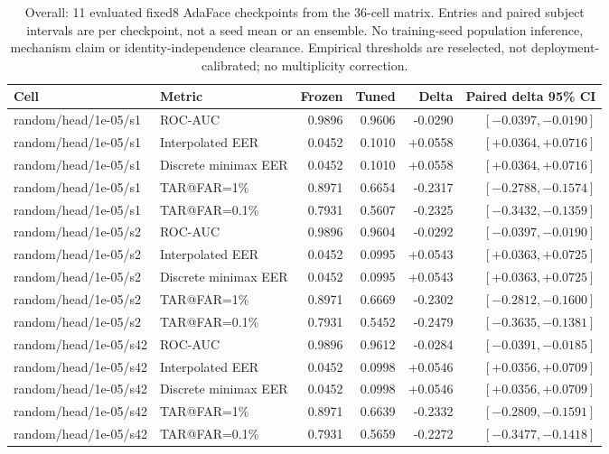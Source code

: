 \documentclass[journal]{IEEEtran}
\begin{document}
\clearpage
\begingroup
\renewcommand{\arraystretch}{0.98}
\begin{table}[!t]
\caption{Overall: 11 evaluated fixed8 AdaFace checkpoints from the 36-cell matrix. Entries and paired subject intervals are per checkpoint, not a seed mean or an ensemble. No training-seed population inference, mechanism claim or identity-independence clearance. Empirical thresholds are reselected, not deployment-calibrated; no multiplicity correction.}
\label{tab:strong-fixed8-overall}
\centering\scriptsize
\begin{tabular}{@{}llrrrr@{}}
\toprule
Cell & Metric & Frozen & Tuned & Delta & Paired delta 95\% CI \\
\midrule
random/head/1e-05/s1 & ROC-AUC & 0.9896 & 0.9606 & -0.0290 & $[-0.0397,-0.0190]$ \\
random/head/1e-05/s1 & Interpolated EER & 0.0452 & 0.1010 & +0.0558 & $[+0.0364,+0.0716]$ \\
random/head/1e-05/s1 & Discrete minimax EER & 0.0452 & 0.1010 & +0.0558 & $[+0.0364,+0.0716]$ \\
random/head/1e-05/s1 & TAR@FAR=1\% & 0.8971 & 0.6654 & -0.2317 & $[-0.2788,-0.1574]$ \\
random/head/1e-05/s1 & TAR@FAR=0.1\% & 0.7931 & 0.5607 & -0.2325 & $[-0.3432,-0.1359]$ \\
random/head/1e-05/s2 & ROC-AUC & 0.9896 & 0.9604 & -0.0292 & $[-0.0397,-0.0190]$ \\
random/head/1e-05/s2 & Interpolated EER & 0.0452 & 0.0995 & +0.0543 & $[+0.0363,+0.0725]$ \\
random/head/1e-05/s2 & Discrete minimax EER & 0.0452 & 0.0995 & +0.0543 & $[+0.0363,+0.0725]$ \\
random/head/1e-05/s2 & TAR@FAR=1\% & 0.8971 & 0.6669 & -0.2302 & $[-0.2812,-0.1600]$ \\
random/head/1e-05/s2 & TAR@FAR=0.1\% & 0.7931 & 0.5452 & -0.2479 & $[-0.3635,-0.1381]$ \\
random/head/1e-05/s42 & ROC-AUC & 0.9896 & 0.9612 & -0.0284 & $[-0.0391,-0.0185]$ \\
random/head/1e-05/s42 & Interpolated EER & 0.0452 & 0.0998 & +0.0546 & $[+0.0356,+0.0709]$ \\
random/head/1e-05/s42 & Discrete minimax EER & 0.0452 & 0.0998 & +0.0546 & $[+0.0356,+0.0709]$ \\
random/head/1e-05/s42 & TAR@FAR=1\% & 0.8971 & 0.6639 & -0.2332 & $[-0.2809,-0.1591]$ \\
random/head/1e-05/s42 & TAR@FAR=0.1\% & 0.7931 & 0.5659 & -0.2272 & $[-0.3477,-0.1418]$ \\

\end{tabular}
\end{table}
\end{document}

